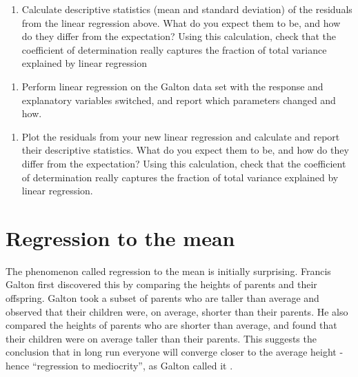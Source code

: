 \documentclass[
  letterpaper,
  DIV=11,
  numbers=noendperiod]{scrreprt}
\providecommand{\tightlist}{%
  \setlength{\itemsep}{0pt}\setlength{\parskip}{0pt}}\usepackage{longtable,booktabs,array}
\begin{document}
\begin{enumerate}
\def\labelenumi{\arabic{enumi}.}
\tightlist
\item
  Calculate descriptive statistics (mean and standard deviation) of the
  residuals from the linear regression above. What do you expect them to
  be, and how do they differ from the expectation? Using this
  calculation, check that the coefficient of determination really
  captures the fraction of total variance explained by linear regression
\end{enumerate}

\begin{enumerate}
\def\labelenumi{\arabic{enumi}.}
\setcounter{enumi}{1}
\tightlist
\item
  Perform linear regression on the Galton data set with the response and
  explanatory variables switched, and report which parameters changed
  and how.
\end{enumerate}

\begin{enumerate}
\def\labelenumi{\arabic{enumi}.}
\setcounter{enumi}{2}
\tightlist
\item
  Plot the residuals from your new linear regression and calculate and
  report their descriptive statistics. What do you expect them to be,
  and how do they differ from the expectation? Using this calculation,
  check that the coefficient of determination really captures the
  fraction of total variance explained by linear regression.
\end{enumerate}

\hypertarget{regression-to-the-mean}{%
\section{Regression to the mean}\label{regression-to-the-mean}}

\label{sec:bio8} The phenomenon called 
regression to the mean is initially surprising. Francis Galton first
discovered this by comparing the heights of parents and their offspring.
Galton took a subset of parents who are taller than average and observed
that their children were, on average, shorter than their parents. He
also compared the heights of parents who are shorter than average, and
found that their children were on average taller than their parents.
This suggests the conclusion that in long run everyone will converge
closer to the average height - hence ``regression to mediocrity'', as
Galton called it \cite{senn_francis_2011}.
\end{document}
